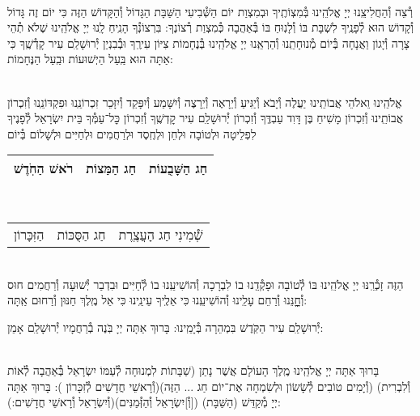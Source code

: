 \documentclass[twoside, openany, parskip=half, 11pt]{book}
\begin{document}
\vspace{-.25\baselineskip}
\begin{sometimes}

\shabbos\\
רְ֯צֵה וְ֯הַחֲלִיצֵֽנוּ יְיָ אֱלֹהֵֽינוּ בְּ֯מִצְוֹתֶֽיךָ וּבְמִצְוַת יוֹם הַשְּׁ֯בִיעִי הַשַּׁבָּת הַגָּדוֹל וְ֯הַקָּדוֹשׁ הַזֶּה כִּי יוֹם זֶה גָּדוֹל וְ֯קָדוֹשׁ הוּא לְ֯פָנֶֽיךָ לִשְׁבָּת בּוֹ וְ֯לָנֽוּחַ בּוֹ בְּ֯אַהֲבָה כְּ֯מִצְוַת רְ֯צוֹנֶךָ: בִּרְצוֹנְ֯ךָ הָנִֽיחַ לָֽנוּ יְיָ אֱלֹהֵֽינוּ שֶׁלֹא תְ֯הֵי צָרָה וְ֯יָגוֹן וַאֲנָחָה בְּ֯יוֹם מְ֯נוּחָתֵֽנוּ וְ֯הַרְאֵֽנוּ יְיָ אֱלֹהֵֽינוּ בְּ֯נֶחָמוֹת צִיּוֹן עִירֶֽךָ וּבְ֯בִנְיַן יְ֯רוּשָׁלַ‍ִם עִיר קָדְ֯שֶֽׁךָ כִּי אַתָּה הוּא בַּֽעַל הַיְשׁוּעוֹת וּבַֽעַל הַנֶּחָמוֹת:


\sepline %

\vspace{-.25\baselineskip}
\\
אֱלֹהֵֽינוּ וֵאלֹהֵי אֲבוֹתֵֽינוּ יַעֲלֶה וְ֯יָבֹא וְ֯יַגִּיעַ וְ֯יֵרָאֶה וְ֯יֵרָצֶה וְ֯יִשָּׁמַע וְ֯יִפָּקֵד וְ֯יִזָּכֵר זִכְרוֹנֵֽנוּ וּפִקְדּוֹנֵֽנוּ וְ֯זִכְרוֹן אֲבוֹתֵֽינוּ וְ֯זִכְרוֹן מָשִׁיחַ בֶּן דָּוִד עַבְדֶּֽךָ וְ֯זִכְרוֹן יְ֯רוּשָׁלַ‍ִם עִיר קׇדְשֶֽׁךָ וְ֯זִכְרוֹן כׇּל־עַמְּ֯ךָ בֵּית יִשְׂרָאֵל לְ֯פָנֶיךָ לִפְלֵיטָה וּלְטוֹבָה וּלְחֵן וּלְחֶֽסֶד וּלְרַחֲמִים וּלְחַיִּים וּלְשָׁלוֹם בְּ֯יוֹם\\
\begin{tabular}{c|c|c}
רֹאשׁ הַחֹֽדֶשׁ & חַג הַמַּצוֹת & חַג הַשָּׁבֻעוֹת\\ \hline
\end{tabular}\\
\begin{tabular}{c|c|c}
הַזִּכָּרוֹן & חַג הַסֻּכּוֹת & שְׁ֯מִינִי חַג הָעֲצֶֽרֶת
\end{tabular}\\
הַזֶּה זָכְ֯רֵֽנּוּ יְיָ אֱלֹהֵֽינוּ בּוֹ לְ֯טוֹבָה וּפָקְ֯דֵֽנוּ בוֹ לִבְרָכָה וְ֯הוֹשִׁיעֵֽנוּ בוֹ לְ֯חַיִּים וּבִדְבַר יְ֯שׁוּעָה וְ֯רַחֲמִים חוּס וְ֯חׇׇׇׇנֵּנוּ וְ֯רַחֵם עָלֵֽינוּ וְ֯הוֹשִׁיעֵֽנוּ כִּי אֵלֶֽיךָ עֵינֵֽינוּ כִּי אֵל מֶֽלֶךְ חַנּוּן וְ֯רַחוּם אַֽתָּה:

\end{sometimes}

יְ֯רוּשָׁלַ‍ִם עִיר הַקֹּֽדֶשׁ בִּמְהֵרָה בְּ֯יָמֵֽינוּ: בָּרוּךְ אַתָּה יְיָ בֹּֽנֶה בְ֯רַחֲמָיו יְ֯רוּשָׁלַ‍ִם אָמֵן:

\begin{sometimes}

\\
בָּרוּךְ אַתָּה יְיָ אֱלֹהֵֽינוּ מֶֽלֶךְ הָעוֹלָם אֲשֶׁר נָתַן (שַׁבָּתוֹת לִמְנוּחָה לְ֯עַמּוֹ יִשְׂרָאֵל בְּ֯אַהֲבָה לְ֯אוֹת וְ֯לִבְרִית)
(וְ֯יָמִים טוֹבִים לְ֯שָׂשׂוֹן וּלְשִׂמְחָה אֶת־יוֹם חַג ... הַזֶּה)(וְ֯רָאשֵׁי חֳדָשִׁים לְ֯זִכָּרוֹן ):
בָּרוּךְ אַתָּה יְיָ מְ֯קַדֵּשׁ (הַשַּׁבָּת) ([וְ֯]יִשְׂרָאֵל וְ֯הַזְּ֯מַנִּים)(וְ֯יִשְׂרָאֵל וְ֯רָאשֵׁי חֳדָשִׁים:):

\end{sometimes}
\end{document}
